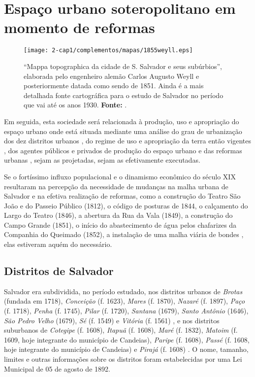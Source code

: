 \section{Espaço urbano soteropolitano em momento de reformas}\label{sec:1.4}

\begin{figure}[!htp]
\centering
\texttt{[image: 2-cap1/complementos/mapas/1855weyll.eps]} 
\caption{``Mappa topographica da cidade de S. Salvador e seus subúrbios'', elaborada pelo engenheiro alemão Carlos Augusto Weyll e posteriormente datada como sendo de 1851. Ainda é a mais detalhada fonte cartográfica para o estudo de Salvador no período que vai até os anos 1930. \textbf{Fonte:} .}
\end{figure}

Em seguida, esta sociedade será relacionada à produção, uso e apropriação do espaço urbano onde está situada mediante uma análise do grau de urbanização dos dez distritos urbanos \cite{NASCIMENTO2007, VASCONCELOS2002}, do regime de uso e apropriação da terra então vigentes \cite{CEDURB1978}, dos agentes públicos e privados de produção do espaço urbano e das reformas urbanas \cite{cardoso_vilas_1991, CUNHA2011}, sejam as projetadas, sejam as efetivamente executadas.

Se o fortíssimo influxo populacional e o dinamismo econômico do século XIX resultaram na percepção da necessidade de mudanças na malha urbana de Salvador e na efetiva realização de reformas, como a construção do Teatro São João e do Passeio Público (1812), o código de posturas de 1844, o calçamento do Largo do Teatro (1846), a abertura da Rua da Vala (1849), a construção do Campo Grande (1851), o início do abastecimento de água pelos chafarizes da Companhia do Queimado (1852), a instalação de uma malha viária de bondes \cite{fernandesgomes1992, fernandessampaiogomes1999,NASCIMENTO2007,sampaio_50_2005}, elas estiveram aquém do necessário.

\subsection{Distritos de Salvador}\label{subsec:1.4.1}

Salvador era subdividida, no período estudado, nos distritos urbanos de \textit{Brotas} (fundada em 1718), \textit{Conceição} (f. 1623), \textit{Mares} (f. 1870), \textit{Nazaré} (f. 1897), \textit{Paço} (f. 1718), \textit{Penha} (f. 1745), \textit{Pilar} (f. 1720), \textit{Santana} (1679), \textit{Santo Antônio }(1646), \textit{São Pedro Velho} (1679), \textit{Sé} (f. 1549) e \textit{Vitória} (f. 1561) \cite[259-307]{VASCONCELOS2002}, e nos distritos suburbanos de \textit{Cotegipe} (f. 1608), \textit{Itapuã} (f. 1608), \textit{Maré} (f. 1832), \textit{Matoim} (f. 1609, hoje integrante do município de Candeias), \textit{Paripe} (f. 1608), \textit{Passé} (f. 1608, hoje integrante do município de Candeias) e \textit{Pirajá} (f. 1608) \cite[p.~53-62]{NASCIMENTO2007}. O nome, tamanho, limites e outras informações sobre os distritos foram estabelecidas por uma Lei Municipal de 05 de agosto de 1892.

